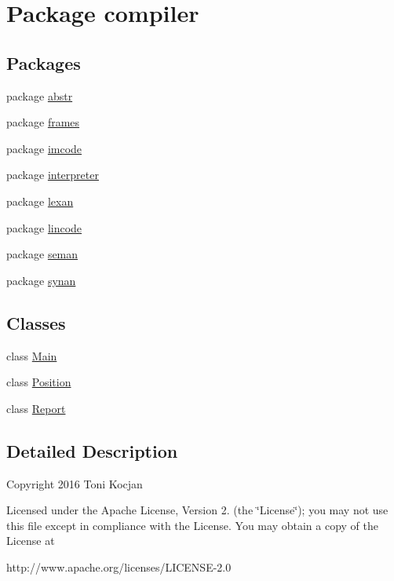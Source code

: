 \hypertarget{namespacecompiler}{}\section{Package compiler}
\label{namespacecompiler}
\subsection*{Packages}
\begin{DoxyCompactItemize}
\item 
package \hyperlink{namespacecompiler_1_1abstr}{abstr}
\item 
package \hyperlink{namespacecompiler_1_1frames}{frames}
\item 
package \hyperlink{namespacecompiler_1_1imcode}{imcode}
\item 
package \hyperlink{namespacecompiler_1_1interpreter}{interpreter}
\item 
package \hyperlink{namespacecompiler_1_1lexan}{lexan}
\item 
package \hyperlink{namespacecompiler_1_1lincode}{lincode}
\item 
package \hyperlink{namespacecompiler_1_1seman}{seman}
\item 
package \hyperlink{namespacecompiler_1_1synan}{synan}
\end{DoxyCompactItemize}
\subsection*{Classes}
\begin{DoxyCompactItemize}
\item 
class \hyperlink{classcompiler_1_1_main}{Main}
\item 
class \hyperlink{classcompiler_1_1_position}{Position}
\item 
class \hyperlink{classcompiler_1_1_report}{Report}
\end{DoxyCompactItemize}


\subsection{Detailed Description}
Copyright 2016 Toni Kocjan

Licensed under the Apache License, Version 2. (the \char`\"{}\+License\char`\"{}); you may not use this file except in compliance with the License. You may obtain a copy of the License at \begin{DoxyVerb}http://www.apache.org/licenses/LICENSE-2.0
\end{DoxyVerb}


